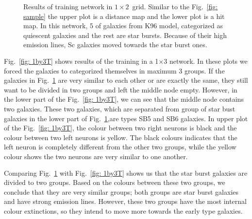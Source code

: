 \begin{figure}
\begin{subfigure}[b]{0.5\textwidth}
                \end{subfigure}
                \caption{Results of training network in $1\times2$~grid. Similar to the Fig.~\ref{fig: sample} the upper plot is a distance map and the lower plot is a hit map. In this network, 5 of galaxies from K96 model, categorized as quiescent galaxies and the rest are star bursts. Because of their high emission lines, Sc galaxies moved towards the star burst ones.}
                 \label{fig: 1by2T}
            \end{figure}
        
            Fig.~\ref{fig: 1by3T} shows results of the training in a 1$\times$3 network.
            In these plots we forced the galaxies to categorized themselves in maximum 3 groups. 
            If the galaxies in Fig.~\ref{fig: 1by2T} are very similar to each other or are exactly the same, they still want to be divided in two groups and left the middle node empty. 
            However, in the lower part of the Fig.~\ref{fig: 1by3T}, we can see that the middle node contains two galaxies.
            These two galaxies, which are separated from group of star bust galaxies in the lower part of Fig.~\ref{fig: 1by2T},are types SB5 and SB6 galaxies.
            In upper plot of the Fig.~\ref{fig: 1by3T}, the colour between two right neurons is black and the colour between two left neurons is yellow. 
            The black colours indicates that the left neuron is completely different from the other two groups, while the yellow colour shows the two neurons are very similar to one another. 
            
            Comparing Fig.~\ref{fig: 1by2T} with Fig.~\ref{fig: 1by3T} shows us that the star burst galaxies are divided to two groups. 
            Based on the colours between these two groups, we conclude that they are very similar groups; both groups are star burst galaxies and have strong emission lines.
            However, these two groups have the most internal colour extinctions, so they intend to move more towards the early type galaxies.
                
